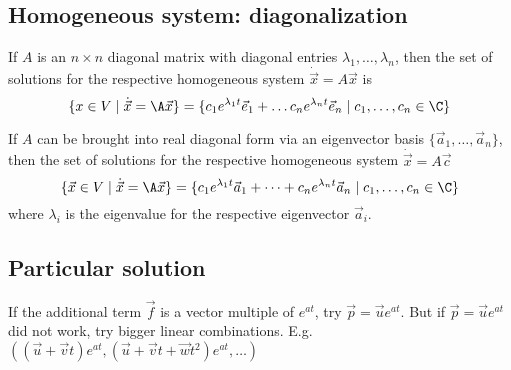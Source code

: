 \subsection{Homogeneous system: diagonalization}
\begin{theorem}
    If $A$ is an $n \times n$ diagonal matrix with diagonal entries $\lambda_1, \dots, \lambda_n$, then the set of solutions
    for the respective homogeneous system $\dot{\vec{x}} = A \vec{x}$ is
    $$\{x\in V \mid \dot{\vec{x}} = \A \vec{x}\} = \{c_1 e^{\lambda_1 t}\vec{e}_1 + \dots c_n e^{\lambda_n t}\vec{e}_n \mid c_1, \dots, c_n \in \C\}$$
\end{theorem}

\begin{theorem}
    If $A$ can be brought into real diagonal form via an eigenvector basis $\{\vec{a}_1, \dots, \vec{a}_n\}$, then the set of solutions for the
    respective homogeneous system $\dot{\vec{x}} = A\vec{c}$
    $$\{\vec{x} \in V \mid \dot{\vec{x}} = \A\vec{x}\} = \{c_1e^{\lambda_1t}\vec{a}_1 + \dots + c_ne^{\lambda_nt}\vec{a}_n \mid c_1, \dots, c_n \in \C \}$$
    where $\lambda_i$ is the eigenvalue for the respective eigenvector $\vec{a}_i$.
\end{theorem}

\subsection{Particular solution}

\begin{remark}
    If the additional term $\vec{f}$ is a vector multiple of $e^{at}$, try $\vec{p} = \vec{u}e^{at}$.
    But if $\vec{p} = \vec{u}e^{at}$ did not work, try bigger linear combinations. E.g. $((\vec{u} + \vec{v}t)e^{at}, (\vec{u}+\vec{v}t+\vec{w}t^2)e^{at},\dots)$

\end{remark}
